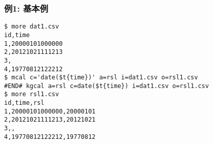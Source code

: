 \subsubsection*{例1: 基本例}



\begin{Verbatim}[baselinestretch=0.7,frame=single]
$ more dat1.csv
id,time
1,20000101000000
2,20121021111213
3,
4,19770812122212
$ mcal c='date($t{time})' a=rsl i=dat1.csv o=rsl1.csv
#END# kgcal a=rsl c=date($t{time}) i=dat1.csv o=rsl1.csv
$ more rsl1.csv
id,time,rsl
1,20000101000000,20000101
2,20121021111213,20121021
3,,
4,19770812122212,19770812
\end{Verbatim}
